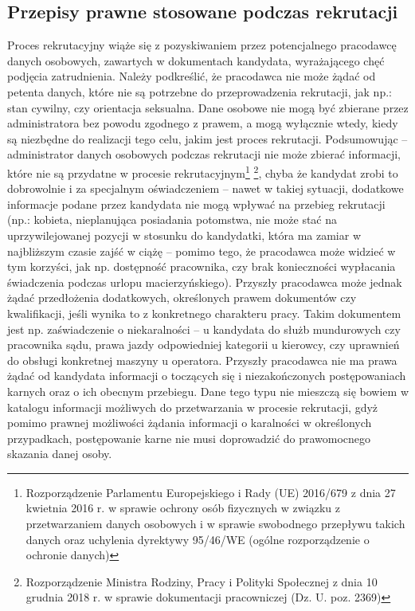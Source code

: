 \documentclass[twoside]{projektInzynierskiMS}
\numberwithin{figure}{section}
\begin{document}
\subsection{Przepisy prawne stosowane podczas rekrutacji}
Proces rekrutacyjny wiąże się z pozyskiwaniem przez potencjalnego pracodawcę danych osobowych, zawartych w dokumentach kandydata, wyrażającego chęć podjęcia zatrudnienia. Należy podkreślić, że pracodawca nie może żądać od petenta danych, które nie są potrzebne do przeprowadzenia rekrutacji, jak np.: stan cywilny, czy orientacja seksualna. Dane osobowe nie mogą być zbierane przez administratora bez powodu zgodnego z prawem, a mogą wyłącznie wtedy, kiedy są niezbędne do realizacji tego celu, jakim jest proces rekrutacji. Podsumowując -- administrator danych osobowych podczas rekrutacji nie może zbierać informacji, które nie są przydatne w procesie rekrutacyjnym\footnote{Rozporządzenie Parlamentu Europejskiego i Rady (UE) 2016/679 z dnia 27 kwietnia 2016 r. w sprawie ochrony osób fizycznych w związku z przetwarzaniem danych osobowych i w sprawie swobodnego przepływu takich danych oraz uchylenia dyrektywy 95/46/WE (ogólne rozporządzenie o ochronie danych)} \footnote{Rozporządzenie Ministra Rodziny, Pracy i Polityki Społecznej z dnia 10 grudnia 2018 r. w sprawie dokumentacji pracowniczej (Dz. U. poz. 2369)}, chyba że kandydat zrobi to dobrowolnie i za specjalnym oświadczeniem – nawet w takiej sytuacji, dodatkowe informacje podane przez kandydata nie mogą wpływać na przebieg rekrutacji (np.: kobieta, nieplanująca posiadania potomstwa, nie może stać na uprzywilejowanej pozycji w stosunku do kandydatki, która ma zamiar w najbliższym czasie zajść w ciążę – pomimo tego, że pracodawca może widzieć w tym korzyści, jak np. dostępność pracownika, czy brak konieczności wypłacania świadczenia podczas urlopu macierzyńskiego). Przyszły pracodawca może jednak żądać przedłożenia dodatkowych, określonych prawem dokumentów czy kwalifikacji, jeśli wynika to z konkretnego charakteru pracy. Takim dokumentem jest np. zaświadczenie o niekaralności -- u kandydata do służb mundurowych czy pracownika sądu, prawa jazdy odpowiedniej kategorii u kierowcy, czy uprawnień do obsługi konkretnej maszyny u operatora.
Przyszły pracodawca nie ma prawa żądać od kandydata informacji o toczących się i niezakończonych postępowaniach karnych oraz o ich obecnym przebiegu. Dane tego typu nie mieszczą się bowiem w katalogu informacji możliwych do przetwarzania w procesie rekrutacji, gdyż pomimo prawnej możliwości żądania informacji o karalności w określonych przypadkach, postępowanie karne nie musi doprowadzić do prawomocnego skazania danej osoby.
\end{document}
